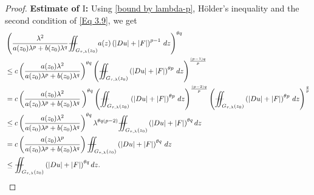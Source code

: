 \documentclass[11pt,oneside, english,reqno,twoside a4paper]{amsart}
\theoremstyle{definition}
\numberwithin{theorem}{section}
\numberwithin{equation}{section}
\newcommand{\iintss}{{\int\hspace{-0.28cm}\int}}
\newcommand{ \miints }{{\iintss\hspace{-0.56cm} -\hspace{-0.15cm}-}}
\newcommand{\miint}[1]{{\miints_{\hspace{-0.13cm}#1}}}
\begin{document}
\begin{proof}
\noindent\textbf{Estimate of $\mathrm{I}$:} Using \eqref{bound by lambda-p}, H\"{o}lder's inequality and the second condition of \eqref{Eq 3.9}, we get
\begin{align*}
&\left(\frac{\lambda^2}{a(z_0)\lambda^p+b(z_0)\lambda^q}\miint{G_{\tau, \lambda}(z_0)}a(z)\left(|Du|+|F|\right)^{p-1}\,dz\right)^{\theta q}\\
&\leq c\left(\frac{a(z_0)\lambda^2}{a(z_0)\lambda^p+b(z_0)\lambda^q}\right)^{\theta q}\left(\miint{G_{\tau, \lambda}(z_0)}\left(|Du|+|F|\right)^{\theta p}\,dz\right)^{\frac{(p-1)q}{p}}\\
&=c\left(\frac{a(z_0)\lambda^2}{a(z_0)\lambda^p+b(z_0)\lambda^q}\,\right)^{\theta q}\left(\miint{G_{\tau, \lambda}(z_0)}\left(|Du|+|F|\right)^{\theta p}\,dz\right)^{\frac{(p-2)q}{p}}\left(\miint{G_{\tau, \lambda}(z_0)}\left(|Du|+|F|\right)^{\theta p}\,dz\right)^{\frac{q}{p}}\\
&\leq c\left(\frac{a(z_0)\lambda^2}{a(z_0)\lambda^p+b(z_0)\lambda^q}\right)^{\theta q}\lambda^{\theta q(p-2)} \miint{G_{\tau, \lambda}(z_0)}\left(|Du|+|F|\right)^{\theta q} dz\\
&=c\left(\frac{a(z_0)\lambda^p}{a(z_0)\lambda^p+b(z_0)\lambda^q}\right) \miint{G_{\tau, \lambda}(z_0)}\left(|Du|+|F|\right)^{\theta q}\,dz\\
&\leq \miint{G_{\tau, \lambda}(z_0)}\left(|Du|+|F|\right)^{\theta q} dz.
\end{align*}


\end{proof}
\end{document}
